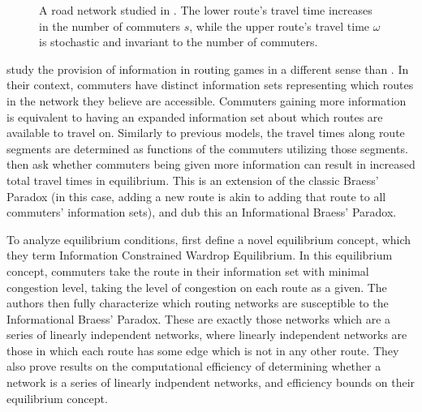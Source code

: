 \documentclass[JEL]{AEA}
\begin{document}
\begin{center}
    \begin{figure}
    \caption{A road network studied in \cite{das-2017}. The lower route's travel time increases in the number of commuters $s$, while the upper route's travel time $\omega$ is stochastic and invariant to the number of commuters. }
    \label{das-fig-1}
    \end{figure}
\end{center}    


\cite{acemoglu-2016} study the provision of information in routing games in a different sense than \cite{das-2017}. In their context, commuters have distinct information sets representing which routes in the network they believe are accessible. Commuters gaining more information is equivalent to having an expanded information set about which routes are available to travel on. Similarly to previous models, the travel times along route segments are determined as functions of the commuters utilizing those segments. \cite{acemoglu-2016} then ask whether commuters being given more information can result in increased total travel times in equilibrium. This is an extension of the classic Braess' Paradox (in this case, adding a new route is akin to adding that route to all commuters' information sets), and \cite{acemoglu-2016} dub this an Informational Braess' Paradox.

To analyze equilibrium conditions, \cite{acemoglu-2016} first define a novel equilibrium concept, which they term Information Constrained Wardrop Equilibrium. In this equilibrium concept, commuters take the route in their information set with minimal congestion level, taking the level of congestion on each route as a given. The authors then fully characterize which routing networks are susceptible to the Informational Braess' Paradox. These are exactly those networks which are a series of linearly independent networks, where linearly independent networks are those in which each route has some edge which is not in any other route. They also prove results on the computational efficiency of determining whether a network is a series of linearly indpendent networks, and efficiency bounds on their equilibrium concept.
\end{document}
